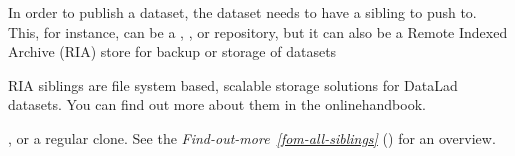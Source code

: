 \sphinxAtStartPar
In order to publish a dataset, the dataset needs to have a sibling to push to.
This, for instance, can be a {\hyperref[\detokenize{glossary:term-GitHub}]{}}, {\hyperref[\detokenize{glossary:term-GitLab}]{}}, or {\hyperref[\detokenize{glossary:term-GIN}]{}}
repository, but it can also be a Remote Indexed Archive (RIA) store for backup
or storage of datasets%
\begin{footnote}\sphinxAtStartFootnote
RIA siblings are file system based, scalable storage solutions for
DataLad datasets. You can find out more about them in the online\sphinxhyphen{}handbook.
%
\end{footnote}, or a regular clone.
See the \textit{Find-out-more}~{\findoutmoreiconinline}\textit{\ref{fom-all-siblings}} {\hyperref[\detokenize{basics/101-141-push:fom-all-siblings}]{}} () for an overview.

